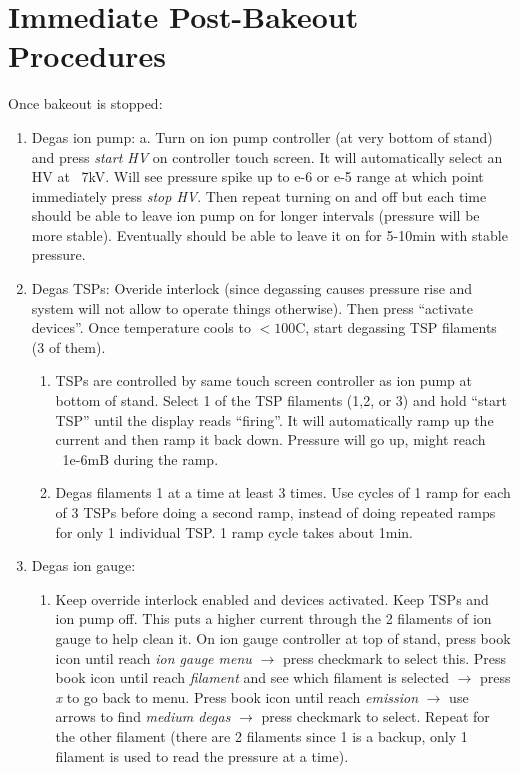\section{Immediate Post-Bakeout Procedures}
Once bakeout is stopped:
\begin{enumerate}
\item	Degas ion pump:
a.	Turn on ion pump controller (at very bottom of stand) and press \emph{start HV} on controller touch screen. It will automatically select an HV at ~7kV. Will see pressure spike up to e-6 or e-5 range at which point immediately press \emph{stop HV}.  Then repeat turning on and off but each time should be able to leave ion pump on for longer intervals (pressure will be more stable). Eventually should be able to leave it on for 5-10min with stable pressure.
\item	Degas TSPs: 
Overide interlock (since degassing causes pressure rise and system will not allow to operate things otherwise). Then press “activate devices”. Once temperature cools to $<100$C, start degassing TSP filaments (3 of them).  
\begin{enumerate}
\item	TSPs are controlled by same touch screen controller as ion pump at bottom of stand. Select 1 of the TSP filaments (1,2, or 3) and hold “start TSP” until the display reads “firing”. It will automatically ramp up the current and then ramp it back down. Pressure will go up, might reach ~1e-6mB during the ramp. 
\item	Degas filaments 1 at a time at least 3 times. Use cycles of 1 ramp for each of 3 TSPs before doing a second ramp, instead of doing repeated ramps for only 1 individual TSP. 1 ramp cycle takes about 1min. 
\end{enumerate}
\item	Degas ion gauge: 
\begin{enumerate}
\item	Keep override interlock enabled and devices activated. Keep TSPs and ion pump off. This puts a higher current through the 2 filaments of ion gauge to help clean it. On ion gauge controller at top of stand, press book icon until reach \emph{ion gauge menu} $\rightarrow$ press checkmark to select this. Press book icon until reach \emph{filament} and see which filament is selected $\rightarrow$ press \emph{x} to go back to menu. Press book icon until reach \emph{emission} $\rightarrow$ use arrows to find \emph{medium degas} $\rightarrow$ press checkmark to select. Repeat for the other filament (there are 2 filaments since 1 is a backup, only 1 filament is used to read the pressure at a time).

\end{enumerate}
\end{enumerate}
